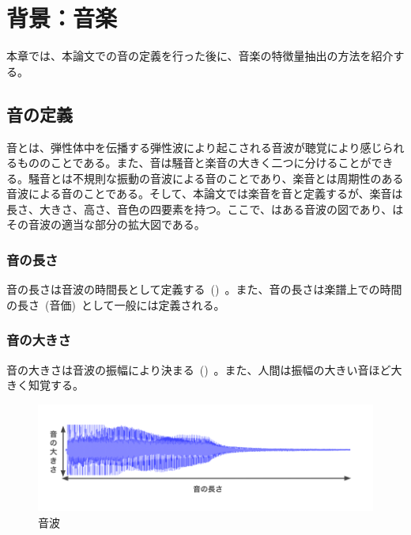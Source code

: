 \chapter{背景：音楽}

本章では、本論文での音の定義を行った後に、音楽の特徴量抽出の方法を紹介する。

\section{音の定義}

音とは、弾性体中を伝播する弾性波により起こされる音波が聴覚により感じられるもののことである。また、音は騒音と楽音の大きく二つに分けることができる。騒音とは不規則な振動の音波による音のことであり、楽音とは周期性のある音波による音のことである。そして、本論文では楽音を音と定義するが、楽音は長さ、大きさ、高さ、音色の四要素を持つ。ここで、はある音波の図であり、はその音波の適当な部分の拡大図である。

\subsection{音の長さ}

音の長さは音波の時間長として定義する~()~。また、音の長さは楽譜上での時間の長さ~(音価)~として一般には定義される。

\subsection{音の大きさ}

音の大きさは音波の振幅により決まる~()~。また、人間は振幅の大きい音ほど大きく知覚する。

\begin{figure}[b]
\centering
\includegraphics[width=\columnwidth]{figure/gakuon1.png}
\caption{音波}
\label{fig:gakuon1}
\end{figure}

